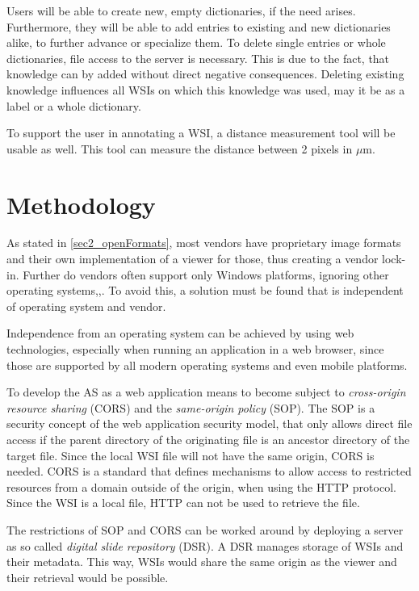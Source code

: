 Users will be able to create new, empty dictionaries, if the need arises. Furthermore, they will be able to add entries to existing and new dictionaries alike, to further advance or specialize them. To delete single entries or whole dictionaries, file access to the server is necessary. This is due to the fact, that knowledge can by added without direct negative consequences. Deleting existing knowledge influences all WSIs on which this knowledge was used, may it be as a label or a whole dictionary.

To support the user in annotating a WSI, a distance measurement tool will be usable as well. This tool can measure the distance between 2 pixels in $\mu$m.


\section{Methodology}
\label{sec4_methodology}
As stated in \ref{sec2_openFormats}, most vendors have proprietary image formats and their own implementation of a viewer for those, thus creating a vendor lock-in. Further do vendors often support only Windows platforms, ignoring other operating systems\cite{Cornish13},\cite{DICOM10},\cite{Farahanil15}. To avoid this, a solution must be found that is independent of operating system and vendor.

Independence from an operating system can be achieved by using web technologies, especially when running an application in a web browser, since those are supported by all modern operating systems and even mobile platforms\cite{Tseytlin14}.

To develop the AS as a web application means to become subject to \emph{cross-origin resource sharing} (CORS)\cite{Kesteren14} and the \emph{same-origin policy} (SOP)\cite{web:mdn}. The SOP is a security concept of the web application security model, that only allows direct file access if the parent directory of the originating file is an ancestor directory of the target file\cite{web:mdn}. Since the local WSI file will not have the same origin, CORS is needed. CORS is a standard that defines mechanisms to allow access to restricted resources from a domain outside of the origin, when using the HTTP protocol\cite{Kesteren14}. Since the WSI is a local file, HTTP can not be used to retrieve the file.

The restrictions of SOP and CORS can be worked around by deploying a server as so called \emph{digital slide repository} (DSR). A DSR manages storage of WSIs and their metadata\cite{Cornish13}. This way, WSIs would share the same origin as the viewer and their retrieval would be possible.


